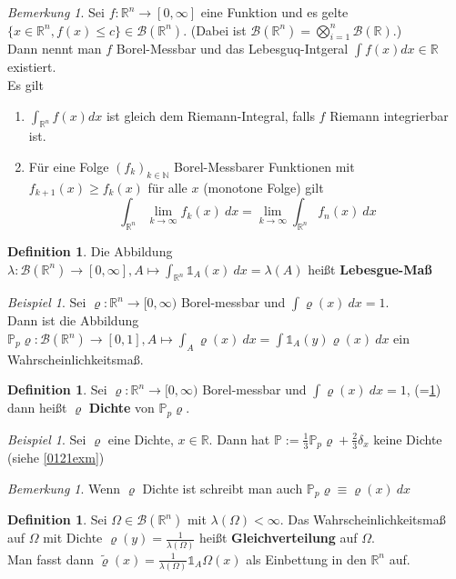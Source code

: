 \documentclass[10pt,a4paper]{article}
\newcommand{\N}{\ensuremath{\mathbb{N}}}
\newcommand{\R}{\ensuremath{\mathbb{R}}}
\newcommand{\la}{\ensuremath{\lambda}}
\newcommand{\cha}{\mathds{1}}
\newcommand{\Bor}{\mathscr B}
\newcommand{\Prb}{\mathbb P}
\theoremstyle{plain}
\theoremstyle{definition}
\newtheorem{definition}[theorem]{Definition}
\theoremstyle{remark}
\newtheorem{bem}[theorem]{Bemerkung}
\newtheorem*{bem*}{Bemerkung}
\newtheorem{exm}[theorem]{Beispiel}
\begin{document}
	\begin{bem}\label{0126bem}
		Sei $f:\R^n\to[0,\infty]$ eine Funktion und es gelte $\{x\in\R^n,f(x)\leq c\}\in\Bor(\R^n)$. (Dabei ist $\Bor(\R^n)=\bigotimes_{i=1}^n\Bor(\R)$.)\\
		Dann nennt man $f$ Borel-Messbar und das Lebesguq-Intgeral $\int f(x)dx\in\R$ existiert.\\
		Es gilt
		\begin{enumerate}
			\item $\int_{\R^n}f(x) dx$ ist gleich dem Riemann-Integral, falls $f$ Riemann integrierbar ist.
			\item Für eine Folge $(f_k)_{k\in\N}$ Borel-Messbarer Funktionen mit $f_{k+1}(x)\geq f_k(x)$ für alle $x$ (monotone Folge) gilt
			\[\int_{\R^n}\lim_{k\to\infty}f_k(x)~dx=\lim_{k\to\infty}\int_{\R^n}f_n(x)~dx\]
		\end{enumerate}
	\end{bem}

	\begin{definition}
		Die Abbildung $\la:\Bor(\R^n)\to[0,\infty], A\mapsto\int_{\R^n}\cha_A(x)~dx=\la(A)$ heißt \textbf{Lebesgue-Maß}
	\end{definition}
	
	\begin{exm}\label{0128exm}
			Sei $\varrho:\R^n\to[0,\infty)$ Borel-messbar und $\int\varrho(x)~dx=1$.\\
			Dann ist die Abbildung $\Prb_p\varrho:\Bor(\R^n)\to[0,1],A\mapsto\int_A\varrho(x)~dx=\int\cha_A(y)\varrho(x)~dx$ ein Wahrscheinlichkeitsmaß.
	\end{exm}

	\begin{definition}
		Sei $\varrho:\R^n\to[0,\infty)$ Borel-messbar und $\int\varrho(x)~dx=1$, (=\ref{0128exm}) dann heißt $\varrho$ \textbf{Dichte} von $\Prb_p\varrho$.
	\end{definition}

	\begin{exm}
		Sei $\varrho$ eine Dichte, $x\in\R$. Dann hat $\Prb:=\frac{1}{3}\Prb_p\varrho+\frac{2}{3}\delta_x$ keine Dichte (siehe \ref{0121exm})
	\end{exm}

	\begin{bem*}
		Wenn $\varrho$ Dichte ist schreibt man auch $\Prb_p\varrho\equiv\varrho(x)~dx$
	\end{bem*}

	\begin{definition}\label{0131def}
		Sei $\Omega\in\Bor(\R^n)$ mit $\la(\Omega)<\infty$. Das Wahrscheinlichkeitsmaß auf $\Omega$ mit Dichte $\varrho(y)=\frac{1}{\la(\Omega)}$ heißt \textbf{Gleichverteilung} auf $\Omega$.\\
		Man fasst dann $\tilde\varrho(x)=\frac{1}{\la(\Omega)}\cha_A\Omega(x)$ als Einbettung in den $\R^n$ auf.
	\end{definition}
\end{document}
